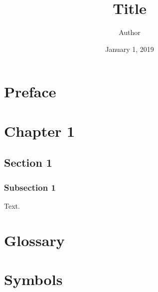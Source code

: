 \documentclass{book}
\begin{document}
\frontmatter
\title{Title}
\author{Author}
\date{January 1, 2019}
\maketitle
\tableofcontents
\chapter{Preface}
\mainmatter
\chapter{Chapter 1}
\section{Section 1}
\subsection{Subsection 1}
Text.
\blindtext[3]
\backmatter
\appendix
\cleardoublepage
{}
\chapter{Glossary}
\chapter{Symbols}
\nocite{*}

% 
\clearpage
{}
\printindex
\end{document}
